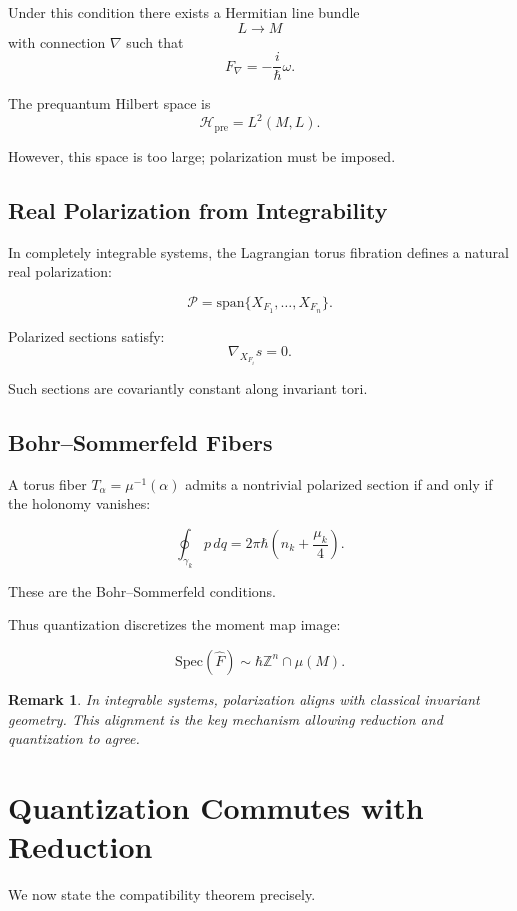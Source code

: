 \documentclass[11pt]{article}
\newtheorem{remark}[theorem]{Remark}
\begin{document}
Under this condition there exists a Hermitian line bundle
\[
L \to M
\]
with connection $\nabla$ such that
\[
F_\nabla = -\frac{i}{\hbar}\omega.
\]

The prequantum Hilbert space is
\[
\mathcal{H}_{\mathrm{pre}} = L^2(M,L).
\]

However, this space is too large; polarization must be imposed.

\subsection{Real Polarization from Integrability}

In completely integrable systems, the Lagrangian torus fibration defines a natural real polarization:

\[
\mathcal{P} = \mathrm{span}\{X_{F_1},\dots,X_{F_n}\}.
\]

Polarized sections satisfy:
\[
\nabla_{X_{F_i}} s = 0.
\]

Such sections are covariantly constant along invariant tori.

\subsection{Bohr--Sommerfeld Fibers}

A torus fiber $T_\alpha = \mu^{-1}(\alpha)$ admits a nontrivial polarized section if and only if the holonomy vanishes:

\[
\oint_{\gamma_k} p\,dq = 2\pi\hbar \left(n_k + \frac{\mu_k}{4}\right).
\]

These are the Bohr--Sommerfeld conditions.

Thus quantization discretizes the moment map image:

\[
\mathrm{Spec}(\hat F) \sim \hbar \mathbb{Z}^n \cap \mu(M).
\]

\begin{remark}
In integrable systems, polarization aligns with classical invariant geometry.
This alignment is the key mechanism allowing reduction and quantization to agree.
\end{remark}

\section{Quantization Commutes with Reduction}

We now state the compatibility theorem precisely.
\end{document}
